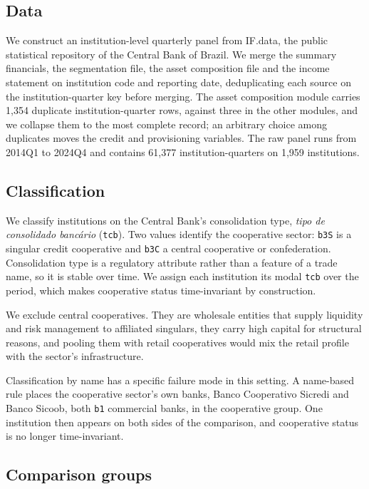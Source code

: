 \documentclass[11pt,a4paper]{article}
\begin{document}
\subsection{Data}

We construct an institution-level quarterly panel from IF.data, the public statistical
repository of the Central Bank of Brazil. We merge the summary financials, the
segmentation file, the asset composition file and the income statement on institution
code and reporting date, deduplicating each source on the institution-quarter key before
merging. The asset composition module carries 1,354 duplicate institution-quarter rows,
against three in the other modules, and we collapse them to the most complete record; an
arbitrary choice among duplicates moves the credit and provisioning variables. The raw
panel runs from 2014Q1 to 2024Q4 and contains 61,377 institution-quarters on 1,959
institutions.

\subsection{Classification}

We classify institutions on the Central Bank's consolidation type, \textit{tipo de
consolidado banc\'ario} (\texttt{tcb}). Two values identify the cooperative sector:
\texttt{b3S} is a singular credit cooperative and \texttt{b3C} a central cooperative or
confederation. Consolidation type is a regulatory attribute rather than a feature of a
trade name, so it is stable over time. We assign each institution its modal \texttt{tcb}
over the period, which makes cooperative status time-invariant by construction.

We exclude central cooperatives. They are wholesale entities that supply liquidity and
risk management to affiliated singulars, they carry high capital for structural reasons,
and pooling them with retail cooperatives would mix the retail profile with the sector's
infrastructure.

Classification by name has a specific failure mode in this setting. A name-based rule
places the cooperative sector's own banks, Banco Cooperativo Sicredi and Banco Sicoob,
both \texttt{b1} commercial banks, in the cooperative group. One institution then appears
on both sides of the comparison, and cooperative status is no longer time-invariant.

\subsection{Comparison groups}
\label{sec:peers}
\end{document}
